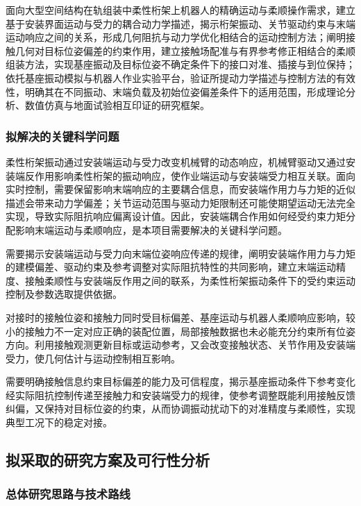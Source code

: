 面向大型空间结构在轨组装中柔性桁架上机器人的精确运动与柔顺操作需求，建立基于安装界面运动与受力的耦合动力学描述，揭示桁架振动、关节驱动约束与末端运动响应之间的关系，形成几何阻抗与动力学优化相结合的运动控制方法；阐明接触几何对目标位姿偏差的约束作用，建立接触场配准与有界参考修正相结合的柔顺组装方法，实现基座振动及目标位姿不确定条件下的接口对准、插接与到位保持；依托基座振动模拟与机器人作业实验平台，验证所提动力学描述与控制方法的有效性，明确其在不同振动、末端负载及初始位姿偏差条件下的适用范围，形成理论分析、数值仿真与地面试验相互印证的研究框架。

\subsubsection{拟解决的关键科学问题}


柔性桁架振动通过安装端运动与受力改变机械臂的动态响应，机械臂驱动又通过安装端反作用影响柔性桁架的振动响应，使作业端运动与安装端受力相互关联。面向实时控制，需要保留影响末端响应的主要耦合信息，而安装端作用力与力矩的近似描述会带来动力学偏差；关节运动范围与驱动力矩限制还可能使期望运动无法完全实现，导致实际阻抗响应偏离设计值。因此，安装端耦合作用如何经受约束力矩分配影响末端运动与柔顺响应，是本项目需要解决的关键科学问题。

需要揭示安装端运动与受力向末端位姿响应传递的规律，阐明安装端作用力与力矩的建模偏差、驱动约束及参考调整对实际阻抗特性的共同影响，建立末端运动精度、接触柔顺性与安装端反作用之间的联系，为柔性桁架振动条件下的受约束运动控制及参数选取提供依据。


对接时的接触位姿和接触力同时受目标偏差、基座运动与机器人柔顺响应影响，较小的接触力不一定对应正确的装配位置，局部接触数据也未必能充分约束所有位姿方向。利用接触观测更新目标或运动参考，又会改变接触状态、关节作用及安装端受力，使几何估计与运动控制相互影响。

需要明确接触信息约束目标偏差的能力及可信程度，揭示基座振动条件下参考变化经实际阻抗控制传递至接触力和安装端受力的规律，使参考调整既能利用接触反馈纠偏，又保持对目标位姿的约束，从而协调振动扰动下的对准精度与柔顺性，实现典型工况下的稳定对接。

\subsection{拟采取的研究方案及可行性分析}

\subsubsection{总体研究思路与技术路线}

